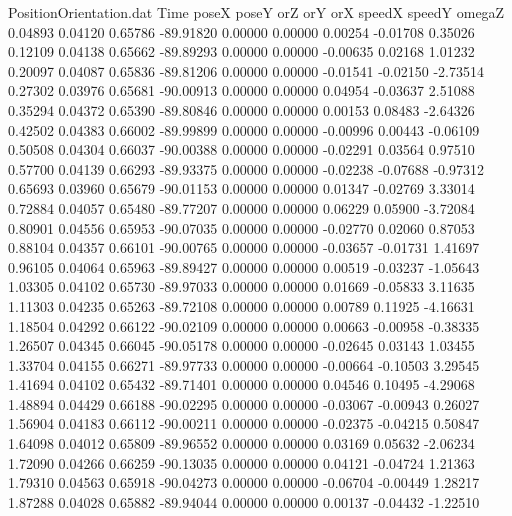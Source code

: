 \begin{filecontents}{PositionOrientation.dat}
Time poseX poseY orZ orY orX speedX speedY omegaZ
   0.04893    0.04120    0.65786   -89.91820    0.00000    0.00000    0.00254   -0.01708    0.35026
   0.12109    0.04138    0.65662   -89.89293    0.00000    0.00000   -0.00635    0.02168    1.01232
   0.20097    0.04087    0.65836   -89.81206    0.00000    0.00000   -0.01541   -0.02150   -2.73514
   0.27302    0.03976    0.65681   -90.00913    0.00000    0.00000    0.04954   -0.03637    2.51088
   0.35294    0.04372    0.65390   -89.80846    0.00000    0.00000    0.00153    0.08483   -2.64326
   0.42502    0.04383    0.66002   -89.99899    0.00000    0.00000   -0.00996    0.00443   -0.06109
   0.50508    0.04304    0.66037   -90.00388    0.00000    0.00000   -0.02291    0.03564    0.97510
   0.57700    0.04139    0.66293   -89.93375    0.00000    0.00000   -0.02238   -0.07688   -0.97312
   0.65693    0.03960    0.65679   -90.01153    0.00000    0.00000    0.01347   -0.02769    3.33014
   0.72884    0.04057    0.65480   -89.77207    0.00000    0.00000    0.06229    0.05900   -3.72084
   0.80901    0.04556    0.65953   -90.07035    0.00000    0.00000   -0.02770    0.02060    0.87053
   0.88104    0.04357    0.66101   -90.00765    0.00000    0.00000   -0.03657   -0.01731    1.41697
   0.96105    0.04064    0.65963   -89.89427    0.00000    0.00000    0.00519   -0.03237   -1.05643
   1.03305    0.04102    0.65730   -89.97033    0.00000    0.00000    0.01669   -0.05833    3.11635
   1.11303    0.04235    0.65263   -89.72108    0.00000    0.00000    0.00789    0.11925   -4.16631
   1.18504    0.04292    0.66122   -90.02109    0.00000    0.00000    0.00663   -0.00958   -0.38335
   1.26507    0.04345    0.66045   -90.05178    0.00000    0.00000   -0.02645    0.03143    1.03455
   1.33704    0.04155    0.66271   -89.97733    0.00000    0.00000   -0.00664   -0.10503    3.29545
   1.41694    0.04102    0.65432   -89.71401    0.00000    0.00000    0.04546    0.10495   -4.29068
   1.48894    0.04429    0.66188   -90.02295    0.00000    0.00000   -0.03067   -0.00943    0.26027
   1.56904    0.04183    0.66112   -90.00211    0.00000    0.00000   -0.02375   -0.04215    0.50847
   1.64098    0.04012    0.65809   -89.96552    0.00000    0.00000    0.03169    0.05632   -2.06234
   1.72090    0.04266    0.66259   -90.13035    0.00000    0.00000    0.04121   -0.04724    1.21363
   1.79310    0.04563    0.65918   -90.04273    0.00000    0.00000   -0.06704   -0.00449    1.28217
   1.87288    0.04028    0.65882   -89.94044    0.00000    0.00000    0.00137   -0.04432   -1.22510

\end{filecontents}
